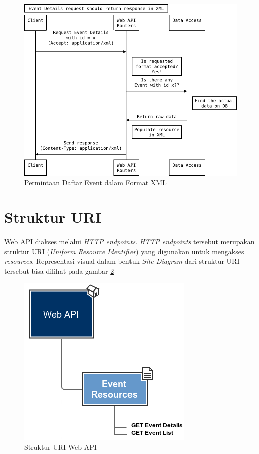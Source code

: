 \documentclass[a4paper, 12pt, oneside]{report}
\begin{document}
\begin{figure}[htp]
\centering
\includegraphics[scale=0.60]{images/event-details-request-seq-diagram-xml.png}
\caption{Permintaan Daftar Event dalam Format XML}
\label{event-list-request-seq-diagram-xml}
\end{figure}

\newpage

\section{Struktur URI}

\onehalfspacing Web API diakses melalui \textit{HTTP endpoints}. \textit{HTTP endpoints} tersebut merupakan struktur URI (\textit{Uniform Resource Identifier}) yang digunakan untuk mengakses \textit{resources}. Representasi visual dalam bentuk \textit{Site Diagram} dari struktur URI tersebut bisa dilihat pada gambar \ref{web-api-uri-structure}

\begin{figure}[htp]
\centering
\includegraphics[scale=0.75]{images/web-api-structure.png}
\caption{Struktur URI Web API}
\label{web-api-uri-structure}
\end{figure}
\end{document}
